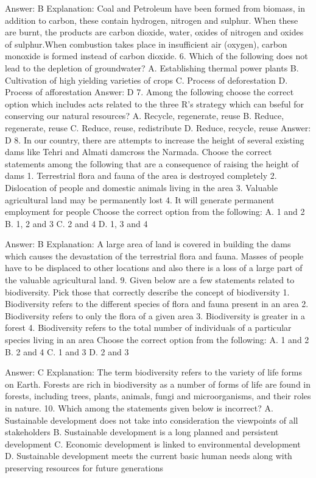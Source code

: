 Answer: B
Explanation: Coal and Petroleum have been formed from biomass, in addition to carbon, these contain hydrogen, nitrogen and sulphur. When these are burnt, the products are carbon dioxide, water, oxides of nitrogen and oxides of sulphur.When combustion takes place in insufficient air (oxygen), carbon monoxide is formed instead of carbon dioxide. 6. Which of the following does not lead to the depletion of groundwater? A. Establishing thermal power plants B. Cultivation of high yielding varieties of crops C. Process of deforestation D. Process of afforestation 
Answer: D 7. Among the following choose the correct option which includes acts related to the three R's strategy which 
can bseful for conserving our natural resources? A. Recycle, regenerate, reuse B. Reduce, regenerate, reuse C. Reduce, reuse, redistribute D. Reduce, recycle, reuse 
Answer: D 8. In our country, there are attempts to increase the height of several existing dams like Tehri and 
Almati damcross the Narmada. Choose the correct statements among the following that are a consequence of raising the height of dams 1. Terrestrial flora and fauna of the area is destroyed completely 2. Dislocation of people and domestic animals living in the area 3. Valuable agricultural land may be permanently lost 4. It will generate permanent employment for people Choose the correct option from the following: A. 1 and 2 B. 1, 2 and 3 C. 2 and 4 D. 1, 3 and 4 

Answer: B
Explanation: A large area of land is covered in building the dams which causes the devastation of the terrestrial flora and fauna. Masses of people have to be displaced to other locations and also there is a loss of a large part of the valuable agricultural land. 9. Given below are a few statements related to biodiversity. Pick those that correctly describe the concept of biodiversity 1. Biodiversity refers to the different species of flora and fauna present in an area 2. Biodiversity refers to only the flora of a given area 3. Biodiversity is greater in a forest 4. Biodiversity refers to the total number of individuals of a particular species living in an area Choose the correct option from the following: A. 1 and 2 B. 2 and 4 C. 1 and 3 D. 2 and 3 

Answer: C
Explanation: The term biodiversity refers to the variety of life forms on Earth. Forests are rich in biodiversity as a number of forms of life are found in forests, including trees, plants, animals, fungi and microorganisms, and their roles in nature. 10. Which among the statements given below is incorrect? A. Sustainable development does not take into consideration the viewpoints of all stakeholders B. Sustainable development is a long planned and persistent development C. Economic development is linked to environmental development D. Sustainable development meets the current basic human needs along with preserving resources for future generations 

